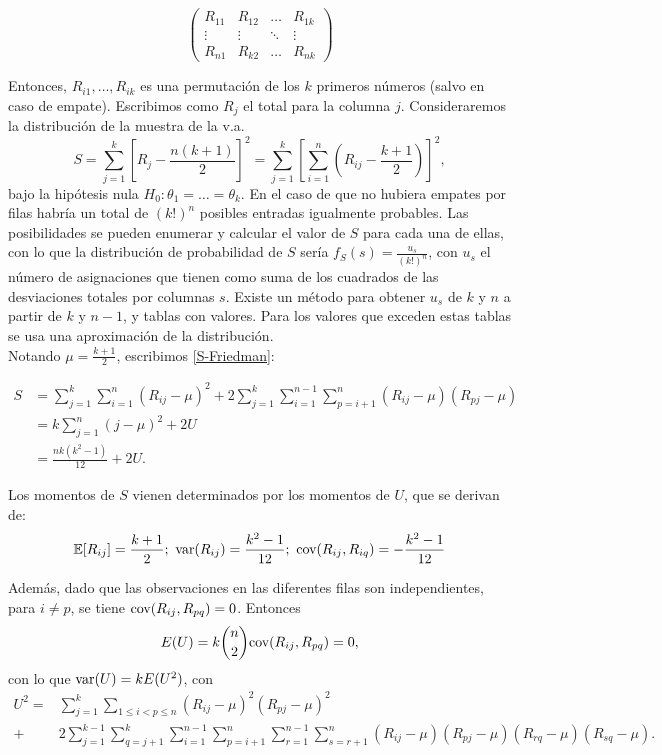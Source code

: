 	\[ \left( \begin{matrix}
		R_{11} & R_{12} & \dots & R_{1k} \\
		\vdots & \vdots & \ddots & \vdots \\
		R_{n1} & R_{k2} & \dots & R_{nk}
		\end{matrix} \right)	\]

	Entonces, $R_{i1}, \dots, R_{ik}$ es una permutación de 
los $k$ primeros números (salvo en caso de empate). 
Escribimos como $R_j$ el total para la columna $j$. 
Consideraremos la distribución de la muestra de la v.a. 
	\begin{equation}
		 S = \sum\limits_{j=1}^k
				\left[
					R_j - \frac{n(k+1)}{2}
				\right]^2 =
			\sum\limits_{j=1}^k \left[
				\sum\limits_{i=1}^n \left(
					R_{ij} - \frac{k+1}{2}
				\right)
			\right]^2,
	\label{S-Friedman}
	\end{equation}
bajo la hipótesis nula $H_0: \theta_1 = \dots = 
\theta_k$. En el caso de que no hubiera empates por filas 
habría un total de $(k!)^n$ posibles entradas igualmente 
probables. Las posibilidades se pueden enumerar y calcular el 
valor de $S$ para cada una de ellas, con lo que la 
distribución de probabilidad de $S$ sería $f_S(s) = 
\frac{u_s}{(k!)^n}$, con $u_s$ el número de asignaciones que 
tienen como suma de los cuadrados de las desviaciones totales 
por columnas $s$. Existe un método para obtener $u_s$ de $k$ 
y $n$ a partir de $k$ y $n-1$, y tablas con valores. Para los 
valores que exceden estas tablas se usa una aproximación de 
la distribución.\\
	Notando $\mu = \frac{k+1}{2}$, escribimos 
	\ref{S-Friedman}:
	
	\begin{align}
		S 	&= 	\sum\limits_{j=1}^k
					\sum\limits_{i=1}^n (R_{ij}-\mu)^2
				+ 2 \sum\limits_{j=1}^k
					\sum\limits_{i=1}^{n-1}
						\sum\limits_{p=i+1}^n
							(R_{ij}-\mu)(R_{pj}-\mu) 
				\nonumber \\
			&=	k \sum\limits_{j=1}^n (j-\mu)^2 + 2U 
				\nonumber \\
			&=  \frac{nk(k^2-1)}{12} + 2U	.
	\label{S-Friedman2}
	\end{align}
	
	Los momentos de $S$ vienen determinados por los momentos 
de $U$, que se derivan de:
	\[ 	\mathbb{E}[ R_{ij} ]= \frac{k+1}{2};\ 
		\var(R_{ij})=\frac{k^2-1}{12};\
		\cov(R_{ij},R_{iq}) = -\frac{k^2-1}{12}
	\]
	
	Además, dado que las observaciones en las diferentes 
filas son independientes, para $i \neq p$, se tiene
$\text{cov}(R_{ij},R_{pq})=0$. Entonces
	\[ E(U) = k {n \choose 2} \text{cov}(R_{ij},R_{pq})=0, \] 
	con lo que $\text{var}(U) = kE(U^2)$, con
	\begin{align*}
		U^2 =& \sum\limits_{j=1}^k
				\sum\limits_{1 \leq i < p \leq n}
					(R_{ij} - \mu)^2 (R_{pj} - \mu)^2 \\
			+& 2 
			    \sum\limits_{j=1}^{k-1}
			      \sum\limits_{q=j+1}^k
					\sum\limits_{i=1}^{n-1}
					  \sum\limits_{p=i+1}^n	
					  	\sum\limits_{r=1}^{n-1}
						  \sum\limits_{s=r+1}^n
				(R_{ij} - \mu)(R_{pj} - \mu)
				(R_{rq} - \mu)(R_{sq} - \mu).
	\end{align*}
	
